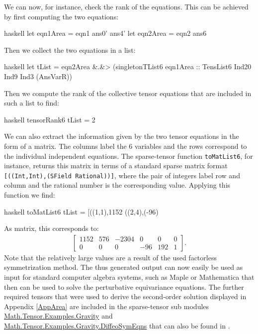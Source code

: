 We can now, for instance, check the rank of the equations. This can be achieved by first computing the two equations:
\begin{center}
\begin{cminted}{haskell}
let eqn1Area = eqn1 ans0' ans4' 
let eqn2Area = eqn2 ans6  
\end{cminted}
\end{center}
Then we collect the two equations in a list:
\begin{center}
\begin{cminted}{haskell}
let tList = eqn2Area &.&> (singletonTList6 eqn1Area ::
            TensList6 Ind20 Ind9 Ind3 (AnsVarR)) 
\end{cminted}
\end{center}
Then we compute the rank of the collective tensor equations that are included in such a list to find:
\begin{center}
\begin{cminted}{haskell}
tensorRank6 tList = 2 
\end{cminted}
\end{center}
We can also extract the information given by the two tensor equations in the form of a matrix. The columns label the 6 variables and the rows correspond to the individual independent equations. The sparse-tensor function \texttt{toMatList6}, for instance, returns this matrix in terms of a standard sparse matrix format \texttt{[((Int,Int),(SField Rational))]}, where the pair of integers label row and column and the rational number is the corresponding value. Applying this function we find:
\begin{center}
\begin{cminted}{haskell}
toMatList6 tList = [((1,1),1152 %
                   ((2,4),(-96) %
\end{cminted}
\end{center}
As matrix, this corresponds to:
\begin{align}
    \begin{bmatrix}
    1152 & 576 & -2304 & 0 & 0 & 0 \\
    0 & 0 & 0 & -96 & 192 & 1
    \end{bmatrix}.
\end{align}
Note that the relatively large values are a result of the used factorless symmetrization method. The thus generated output can now easily be used as input for standard computer algebra systems, such as Maple or Mathematica that then can be used to solve the perturbative equivariance equations.
The further required tensors that were used to derive the second-order solution displayed in Appendix \ref{AppArea}
are included in the sparse-tensor sub modules \href{http://hackage.haskell.org/package/sparse-tensor-0.2.1.1/docs/Math-Tensor-Examples-Gravity.html}{Math.Tensor.Examples.Gravity} and \href{http://hackage.haskell.org/package/sparse-tensor-0.2.1.1/docs/Math-Tensor-Examples-Gravity-DiffeoSymEqns.html}{Math.Tensor.Examples.Gravity.DiffeoSymEqns} that can also be found in \cite{sparse-tensor}. 
